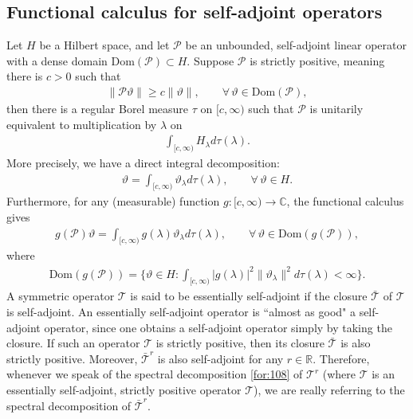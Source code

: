 \documentclass[11 pt]{amsart}
\newcommand{\RR}{\mathbb{R}}
\newcommand{\CC}{\mathbb{C}}
\newcommand{\norm}[1]{\lVert#1\rVert}
\theoremstyle{definition}
\numberwithin{equation}{section}
\begin{document}
\subsection{Functional calculus for self-adjoint operators}\label{sec:19} Let $H$ be a Hilbert space, and let
  $\mathcal{P}$ be an unbounded, self-adjoint linear operator with a dense domain $\text{Dom}(\mathcal{P})\subset H$. Suppose $\mathcal{P}$ is strictly positive, meaning there is $c>0$ such that
\begin{align*}
  \norm{\mathcal{P}\vartheta}\geq c\norm{\vartheta},\qquad \forall\,\vartheta\in \text{Dom}(\mathcal{P}),
\end{align*}
then there is a regular Borel measure $\tau$ on $[c,\infty)$ such that $\mathcal{P}$ is unitarily equivalent to multiplication by $\lambda$ on
\begin{align}\label{for:108}
 \int_{[c,\infty)} H_\lambda d\tau(\lambda).
\end{align}
More precisely, we have
a direct integral decomposition:
\begin{align*}
  \vartheta=\int_{[c,\infty)}\vartheta_\lambda d\tau(\lambda),\qquad \forall \,\vartheta\in H.
\end{align*}
Furthermore, for any (measurable) function $g:[c,\infty)\to\CC$, the functional calculus gives
\begin{align*}
  g(\mathcal{P})\vartheta=\int_{[c,\infty)}g(\lambda)\vartheta_\lambda d\tau(\lambda),\qquad \forall \,\vartheta\in \text{Dom}(g(\mathcal{P})),
\end{align*}
where
\begin{align*}
 \text{Dom}(g(\mathcal{P}))=\{\vartheta\in H: \int_{[c,\infty)}|g(\lambda)|^2\norm{\vartheta_\lambda}^2 d\tau(\lambda)<\infty\}.
\end{align*}
A symmetric operator $\mathcal{T}$ is said to be essentially self-adjoint if the closure $\bar{\mathcal{T}}$ of
$\mathcal{T}$ is self-adjoint. An essentially self-adjoint operator is ``almost as good" a self-adjoint operator, since one obtains a self-adjoint operator simply by taking the closure.
If such an operator $\mathcal{T}$ is strictly positive, then its closure $\bar{\mathcal{T}}$ is also strictly positive. Moreover, $\bar{\mathcal{T}}^{\!r}$ is also self-adjoint for any $r\in\RR$.
Therefore, whenever we speak of the spectral decomposition \eqref{for:108} of $\mathcal{T}^{\!r}$ (where $\mathcal{T}$ is an essentially self-adjoint, strictly positive operator $\mathcal{T}$),
we are really referring to the spectral decomposition of
$\bar{\mathcal{T}}^r$.
\end{document}

